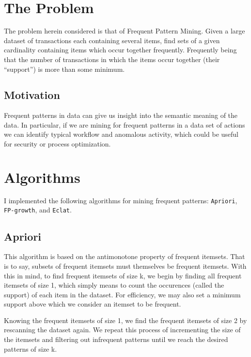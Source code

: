 \documentclass[11pt]{article}
\begin{document}
\begin{multicols}{2} %


\section{The Problem}

The problem herein considered is that of Frequent Pattern Mining.
Given a large dataset of transactions each containing several items,
find sets of a given cardinality containing items which occur together
frequently.  Frequently being that the number of transactions in which
the items occur together (their ``support'') is more than some
minimum\cite{Han2007,fpmlecture}.

\subsection{Motivation}

Frequent patterns in data can give us insight into the semantic
meaning of the data.  In particular, if we are mining for frequent
patterns in a data set of actions we can identify typical workflow and
anomalous activity, which could be useful for security or process
optimization.

\section{Algorithms}

I implemented the following algorithms for mining frequent patterns:
\texttt{Apriori}\cite{Agrawal94}, \texttt{FP-growth}\cite{Han04}, and
\texttt{Eclat}\cite{Zaki97}.

\subsection{Apriori}

This algorithm is based on the antimonotone property of frequent
itemsets.  That is to say, subsets of frequent itemsets must
themselves be frequent itemsets.  With this in mind, to find frequent
itemsets of size k, we begin by finding all frequent itemsets of size
1, which simply means to count the occurences (called the support) of
each item in the dataset.  For efficiency, we may also set a minimum
support above which we consider an itemset to be frequent.

Knowing the frequent itemsets of size 1, we find the frequent itemsets
of size 2 by rescanning the dataset again.  We repeat this process of
incrementing the size of the itemsets and filtering out infrequent
patterns until we reach the desired patterns of size k.


\end{multicols}
\end{document}
